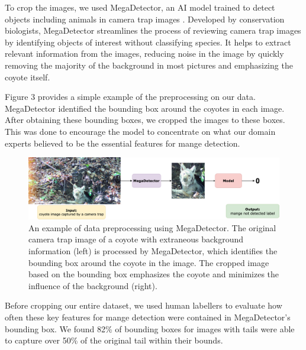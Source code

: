 \documentclass{article}
\begin{document}
To crop the images, we used MegaDetector, an AI model trained to detect objects including animals in camera trap images \cite{Fennell2022, beery2019efficient}. Developed by conservation biologists, MegaDetector streamlines the process of reviewing camera trap images by identifying objects of interest without classifying species. It helps to extract relevant information from the images, reducing noise in the image by quickly removing the majority of the background in most pictures and emphasizing the coyote itself.

Figure 3 provides a simple example of the preprocessing on our data. MegaDetector identified the bounding box around the coyotes in each image. After obtaining these bounding boxes, we cropped the images to these boxes. This was done to encourage the model to concentrate on what our domain experts believed to be the essential features for mange detection.

\begin{figure}[H]
\centering
\includegraphics[width=1.0\textwidth]{fig3.png}
\caption{\label{fig:fig3}An example of data preprocessing using MegaDetector. The original camera trap image of a coyote with extraneous background information (left) is processed by MegaDetector, which identifies the bounding box around the coyote in the image. The cropped image based on the bounding box emphasizes the coyote and minimizes the influence of the background (right).}
\end{figure}

Before cropping our entire dataset, we used human labellers to evaluate how often these key features for mange detection were contained in MegaDetector’s bounding box. We found 82\% of bounding boxes for images with tails were able to capture over 50\% of the original tail within their bounds.
\end{document}
